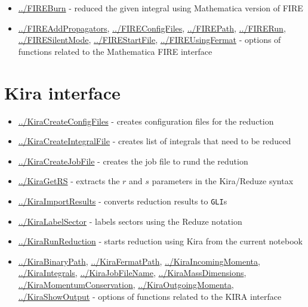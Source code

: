 \documentclass[../FeynHelpersManual.tex]{subfiles}
\begin{document}
\begin{itemize}
\tightlist
\item
  \hyperlink{../fireburn}{../FIREBurn} - reduced the given integral
  using Mathematica version of FIRE
\item
  \hyperlink{../fireaddpropagators}{../FIREAddPropagators},
  \hyperlink{../fireconfigfiles}{../FIREConfigFiles},
  \hyperlink{../firepath}{../FIREPath},
  \hyperlink{../firerun}{../FIRERun},
  \hyperlink{../firesilentmode}{../FIRESilentMode},
  \hyperlink{../firestartfile}{../FIREStartFile},
  \hyperlink{../fireusingfermat}{../FIREUsingFermat} - options of
  functions related to the Mathematica FIRE interface
\end{itemize}

\hypertarget{kira interface}{
\section{Kira interface}\label{kira interface}}

\begin{itemize}
\tightlist
\item
  \hyperlink{../kiracreateconfigfiles}{../KiraCreateConfigFiles} -
  creates configuration files for the reduction
\item
  \hyperlink{../kiracreateintegralfile}{../KiraCreateIntegralFile} -
  creates list of integrals that need to be reduced
\item
  \hyperlink{../kiracreatejobfile}{../KiraCreateJobFile} - creates the
  job file to rund the redution
\item
  \hyperlink{../kiragetrs}{../KiraGetRS} - extracts the \(r\) and \(s\)
  parameters in the Kira/Reduze syntax
\item
  \hyperlink{../kiraimportresults}{../KiraImportResults} - converts
  reduction results to \texttt{GLI}s
\item
  \hyperlink{../kiralabelsector}{../KiraLabelSector} - labels sectors
  using the Reduze notation
\item
  \hyperlink{../kirarunreduction}{../KiraRunReduction} - starts
  reduction using Kira from the current notebook
\item
  \hyperlink{../kirabinarypath}{../KiraBinaryPath},
  \hyperlink{../kirafermatpath}{../KiraFermatPath},
  \hyperlink{../kiraincomingmomenta}{../KiraIncomingMomenta},
  \hyperlink{../kiraintegrals}{../KiraIntegrals},
  \hyperlink{../kirajobfilename}{../KiraJobFileName},
  \hyperlink{../kiramassdimensions}{../KiraMassDimensions},
  \hyperlink{../kiramomentumconservation}{../KiraMomentumConservation},
  \hyperlink{../kiraoutgoingmomenta}{../KiraOutgoingMomenta},
  \hyperlink{../kirashowoutput}{../KiraShowOutput} - options of
  functions related to the KIRA interface
\end{itemize}
\end{document}
